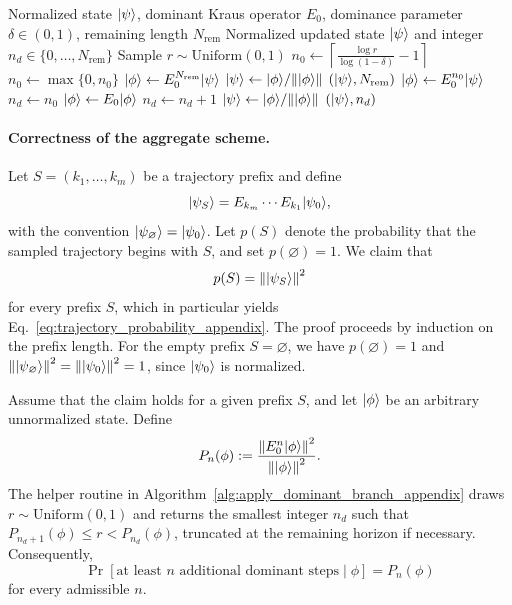 \documentclass[showpacs,amsmath,amssymb,twocolumn,prx,superscriptaddress,10pt,aps,nofootinbib]{revtex4-2}
\DeclarePairedDelimiter\ket{|}{\rangle}
\begin{document}
\begin{algorithm}[H]
\caption{Helper routine for the dominant branch}
\label{alg:apply_dominant_branch_appendix}
\small
\begin{algorithmic}[1]
\Require Normalized state $\ket{\psi}$, dominant Kraus operator $E_0$, dominance parameter $\delta\in(0,1)$, remaining length $N_{\mathrm{rem}}$
\Ensure Normalized updated state $\ket{\psi}$ and integer $n_d\in\{0,\ldots,N_{\mathrm{rem}}\}$
\State Sample $r \sim \mathrm{Uniform}(0,1)$
\State $n_0 \gets \left\lceil \frac{\log r}{\log(1-\delta)} - 1 \right\rceil$
\State $n_0 \gets \max\{0, n_0\}$
    \State $\ket{\phi} \gets E_0^{N_{\mathrm{rem}}}\ket{\psi}$
    \State $\ket{\psi} \gets \ket{\phi} / \norm{\ket{\phi}}$
    \State \Return $(\ket{\psi}, N_{\mathrm{rem}})$
\EndIf
\State $\ket{\phi} \gets E_0^{n_0}\ket{\psi}$
\State $n_d \gets n_0$
    \State $\ket{\phi} \gets E_0\ket{\phi}$
    \State $n_d \gets n_d + 1$
\EndWhile
\State $\ket{\psi} \gets \ket{\phi} / \norm{\ket{\phi}}$
\State \Return $(\ket{\psi}, n_d)$
\end{algorithmic}
\end{algorithm}

\paragraph{Correctness of the aggregate scheme.}
Let $S=(k_1,\ldots,k_m)$ be a trajectory prefix and define
\begin{equation}
    \ket{\psi_S} = E_{k_m} \cdots E_{k_1} \ket{\psi_0},
\end{equation}
with the convention $\ket{\psi_{\varnothing}} = \ket{\psi_0}$. Let $p(S)$ denote the probability that the sampled trajectory begins with $S$, and set $p(\varnothing)=1$. We claim that
\begin{equation}
    p(S) = \norm{\ket{\psi_S}}^2
\end{equation}
for every prefix $S$, which in particular yields Eq.~\eqref{eq:trajectory_probability_appendix}. The proof proceeds by induction on the prefix length. For the empty prefix $S=\varnothing$, we have $p(\varnothing)=1$ and $\norm{\ket{\psi_\varnothing}}^2=\norm{\ket{\psi_0}}^2=1$, since $\ket{\psi_0}$ is normalized.

Assume that the claim holds for a given prefix $S$, and let $\ket{\phi}$ be an arbitrary unnormalized state. Define
\begin{equation}
    P_n(\phi) := \frac{\norm{E_0^n \ket{\phi}}^2}{\norm{\ket{\phi}}^2}.
\end{equation}
The helper routine in Algorithm~\ref{alg:apply_dominant_branch_appendix} draws $r\sim \mathrm{Uniform}(0,1)$ and returns the smallest integer $n_d$ such that $P_{n_d+1}(\phi) \le r < P_{n_d}(\phi)$, truncated at the remaining horizon if necessary. Consequently,
\begin{equation}
    \Pr[\text{at least $n$ additional dominant steps} \mid \phi] = P_n(\phi)
\end{equation}
for every admissible $n$.
\end{document}

